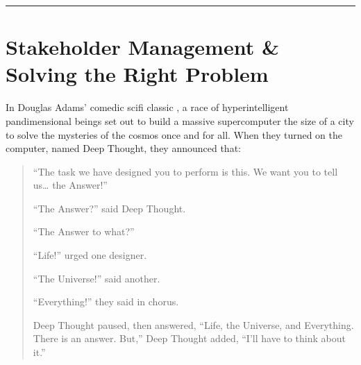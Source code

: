 \documentclass[letterpaper,10pt,english]{jupyterBook}
\begin{document}
\bigskip\hrule\bigskip


\sphinxstepscope


\chapter{Stakeholder Management \& Solving the Right Problem}
\label{\detokenize{10_introduction/30_solving_the_right_problem:stakeholder-management-solving-the-right-problem}}\label{\detokenize{10_introduction/30_solving_the_right_problem::doc}}
\sphinxAtStartPar
In Douglas Adams’ comedic sci\sphinxhyphen{}fi classic , a race of hyperintelligent pandimensional beings set out to build a massive supercomputer the size of a city to solve the mysteries of the cosmos once and for all. When they turned on the computer, named Deep Thought, they announced that:
\begin{quote}

\sphinxAtStartPar
“The task we have designed you to perform is this. We want you to tell us… the Answer!”

\sphinxAtStartPar
“The Answer?” said Deep Thought.

\sphinxAtStartPar
“The Answer to what?”

\sphinxAtStartPar
“Life!” urged one designer.

\sphinxAtStartPar
“The Universe!” said another.

\sphinxAtStartPar
“Everything!” they said in chorus.

\sphinxAtStartPar
Deep Thought paused, then answered, “Life, the Universe, and Everything. There is an answer. But,” Deep Thought added, “I’ll have to think about it.”
\end{quote}
\end{document}
